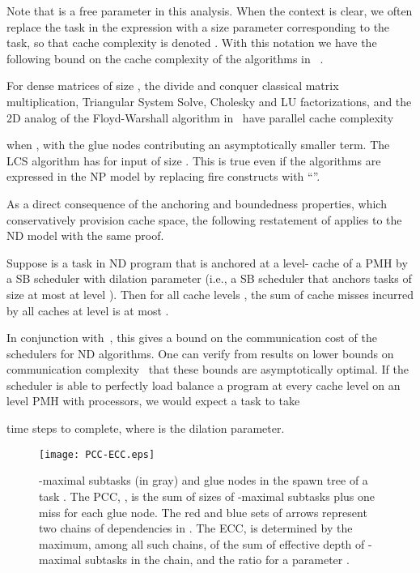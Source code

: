 Note that  is a free parameter in this analysis. When the context
is clear, we often replace the task  in the  expression with
a size parameter corresponding to the task, so that cache complexity
is denoted . With this notation we have the following bound
on the cache complexity of the algorithms in ~.

\begin{claim}
For dense matrices of size , the divide and conquer
classical matrix multiplication, Triangular System Solve, Cholesky
and LU factorizations, and the 2D analog of the Floyd-Warshall algorithm
in~ have parallel cache complexity 

when , with the glue nodes contributing an asymptotically
smaller term. The LCS algorithm has  for input
of size . This is true even if the algorithms are
expressed in the NP model by replacing fire constructs with ``''.
\label{clm:pcc-algos}
\end{claim}

As a direct consequence of the anchoring and boundedness properties,
which conservatively provision cache space, the following restatement
of \cite[Theorem 3] {BlellochFiGi11} applies to the ND model with the
same proof.
\begin{theorem}
\vspace{-3pt}
Suppose  is a task in ND program that is anchored at a level-
cache of a PMH by a SB scheduler with dilation parameter 
(i.e., a SB scheduler that anchors tasks of size at most 
at level ). Then for all cache levels , the sum of
cache misses incurred by all caches at level  is at most
.
\end{theorem}

In conjunction with~, this gives a bound on
the communication cost of the schedulers for ND algorithms. One can
verify from results on lower bounds on communication
complexity~\cite{BallardDeHoSc11} that these bounds are asymptotically
optimal.  If the scheduler is able to perfectly load balance a program
at every cache level on an  level PMH with  processors, we would
expect a task  to take

time steps to complete, where  is the dilation parameter.

\begin{figure}[!t]
\texttt{[image: PCC-ECC.eps]}
\vspace{1ex}
\caption{-maximal subtasks (in gray) and glue nodes in the spawn tree 
of a task . The PCC, , is the sum of sizes of -maximal
subtasks plus one miss for each glue node. The red and blue sets of arrows
represent two chains of dependencies in . The ECC,  is
determined by the maximum, among all such chains, of the sum of effective
depth of -maximal subtasks in the chain, and the ratio 
 for a parameter .
\label{fig:CC}}
\vspace{1ex}
\end{figure}

